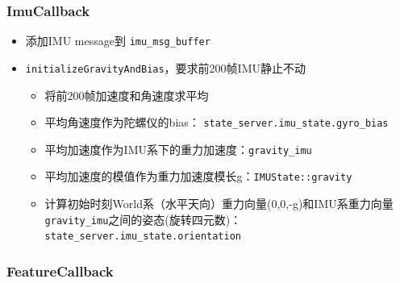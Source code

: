 \documentclass[12pt,a4paper]{article}
\begin{document}
\subsubsection{ImuCallback}

\begin{itemize}

\item 添加IMU message到 \verb|imu_msg_buffer|

\item \verb|initializeGravityAndBias|，要求前200帧IMU静止不动

\begin{itemize}
\item 将前200帧加速度和角速度求平均
\item 平均角速度作为陀螺仪的bias： \verb|state_server.imu_state.gyro_bias|
\item 平均加速度作为IMU系下的重力加速度：\verb|gravity_imu|
\item 平均加速度的模值作为重力加速度模长g：\verb|IMUState::gravity|
\item 计算初始时刻World系（水平天向）重力向量(0,0,-g)和IMU系重力向量\verb|gravity_imu|之间的姿态(旋转四元数)：\verb|state_server.imu_state.orientation|
\end{itemize}

\end{itemize}

\subsubsection{FeatureCallback}
\end{document}
